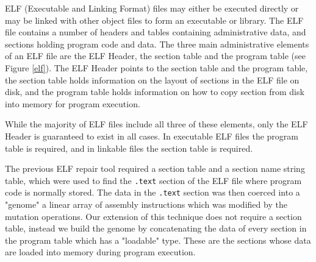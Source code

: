 \documentclass{sigcomm-alternate}
\begin{document}
ELF (Executable and Linking Format) \cite{tis1995tool} files may either
be executed directly or may be linked with other object files to form
an executable or library.  The ELF file contains a number of headers
and tables containing administrative data, and sections holding
program code and data.  The three main administrative elements of an
ELF file are the ELF Header, the section table and the program table
(see Figure \ref{elf}).  The ELF Header points to the section table and the
program table, the section table holds information on the layout of
sections in the ELF file on disk, and the program table holds
information on how to copy section from disk into memory for program
execution.


While the majority of ELF files include all three of these elements,
only the ELF Header is guaranteed to exist in all cases.  In
executable ELF files the program table is required, and in linkable
files the section table is required.

The previous ELF repair tool required a section table and a section
name string table, which were used to find the \texttt{.text} section of the
ELF file where program code is normally stored.  The data in the
\texttt{.text} section was then coerced into a "genome" a linear array of
assembly instructions which was modified by the mutation operations.
Our extension of this technique does not require a section table,
instead we build the genome by concatenating the data of every section
in the program table which has a "loadable" type.  These are the
sections whose data are loaded into memory during program execution.
\end{document}
